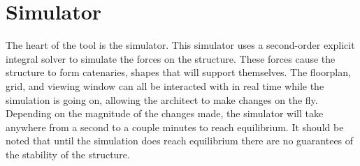 \documentclass{thesis}
\begin{document}
\section{Simulator}
The heart of the tool is the simulator.  This simulator uses a second-order explicit integral solver to simulate the forces on the structure.  These forces
cause the structure to form catenaries, shapes that will support themselves.  The floorplan, grid, and viewing window can all be interacted with in real
time while the simulation is going on, allowing the architect to make changes on the fly.  Depending on the magnitude of the changes made, the simulator
will take anywhere from a second to a couple minutes to reach equilibrium.  It should be noted that until the simulation does reach equilibrium there are
no guarantees of the stability of the structure.


\begin{singlespace}


\end{singlespace}

%
%
\end{document}
